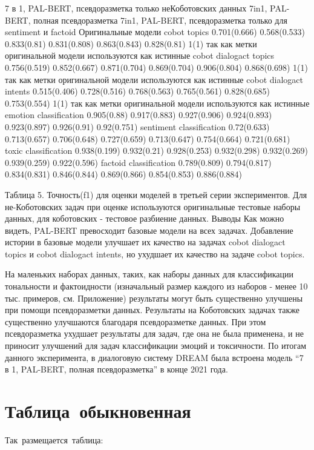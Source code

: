7 в 1, PAL-BERT, 
псевдоразметка  только неКоботовских данных
7in1, PAL-BERT, полная псевдоразметка
7in1, PAL-BERT, псевдоразметка только для sentiment и factoid 
Оригинальные модели
cobot topics
0.701(0.666)
0.568(0.533)
0.833(0.81)
0.831(0.808)
0.863(0.843)
0.828(0.81)
1(1) так как метки оригинальной модели используются как истинные
cobot dialogact topics
0.756(0.519)
0.852(0.667)
0.871(0.704)
0.869(0.704)
0.906(0.804)
0.868(0.698)
1(1) так как метки оригинальной модели используются как истинные
cobot dialogact intents
0.515(0.406)
0.728(0.516)
0.768(0.563)
0.765(0.561)
0.828(0.685)
0.753(0.554)
1(1) так как метки оригинальной модели используются как истинные
emotion classification
0.905(0.88)
0.917(0.883)
0.927(0.906)
0.924(0.893)
0.923(0.897)
0.926(0.91)
0.92(0.751)
sentiment classification
0.72(0.633)
0.713(0.657)
0.706(0.648)
0.727(0.659)
0.713(0.647)
0.754(0.664)
0.721(0.681)
toxic classification
0.938(0.199)
0.932(0.21)
0.928(0.253)
0.932(0.298)
0.932(0.269)
0.939(0.259)
0.922(0.596)
factoid classification
0.789(0.809)
0.794(0.817)
0.834(0.831)
0.846(0.844)
0.869(0.866)
0.854(0.853)
0.886(0.884)


Таблица 5. Точность(f1) для оценки моделей в третьей серии экспериментов. Для не-Коботовских задач при оценке используются оригинальные тестовые наборы данных, для коботовских - тестовое разбиение данных.
Выводы
Как можно видеть, PAL-BERT превосходит базовые модели на всех задачах. Добавление истории в базовые модели улучшает их качество на задачах cobot dialogact topics и cobot dialogact intents, но ухудшает их качество на задаче cobot topics.

На маленьких наборах данных, таких, как наборы данных для классификации тональности и фактоидности (изначальный размер каждого из наборов - менее 10 тыс. примеров, см. Приложение) результаты могут быть существенно улучшены при помощи псевдоразметки данных. Результаты на Коботовских задачах также существенно улучшаются благодаря псевдоразметке данных. При этом псевдоразметка ухудшает результаты для задач, где она не была применена, и не приносит улучшений для задач классификации эмоций и токсичности.
По итогам данного эксперимента, в диалоговую систему DREAM была встроена модель “7 в 1, PAL-BERT, полная псевдоразметка” в конце 2021 года.


 \section{Таблица обыкновенная}\label{sec:ch3/sect1} 
  
 Так размещается таблица: 
  
